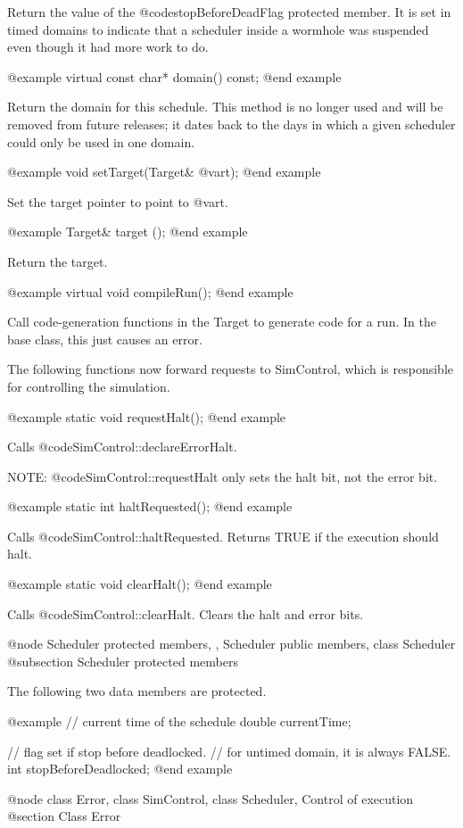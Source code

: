 Return the value of the @code{stopBeforeDeadFlag} protected member.
It is set in timed domains to indicate that a scheduler inside a
wormhole was suspended even though it had more work to do.

@example
virtual const char* domain() const;
@end example

Return the domain for this schedule.  This method is no longer used and
will be removed from future releases; it dates back to the days
in which a given scheduler could only be used in one domain.

@example
void setTarget(Target& @var{t});
@end example

Set the target pointer to point to @var{t}.

@example
Target& target ();
@end example

Return the target.

@example
virtual void compileRun();
@end example

Call code-generation functions in the Target to generate
code for a run.
In the base class, this just causes an error.

The following functions now forward requests to SimControl,
which is responsible for controlling the simulation.

@example
static void requestHalt();
@end example

Calls @code{SimControl::declareErrorHalt}.

NOTE: @code{SimControl::requestHalt} only sets the halt bit,
not the error bit.

@example
static int haltRequested();
@end example

Calls @code{SimControl::haltRequested}.  Returns TRUE if the
execution should halt.

@example
static void clearHalt();
@end example

Calls @code{SimControl::clearHalt}.  Clears the halt and error
bits.

@node Scheduler protected members,  , Scheduler public members, class Scheduler
@subsection Scheduler protected members

The following two data members are protected.

@example
// current time of the schedule
double currentTime;

// flag set if stop before deadlocked.
// for untimed domain, it is always FALSE.
int stopBeforeDeadlocked;
@end example

@node class Error, class SimControl, class Scheduler, Control of execution
@section Class Error

